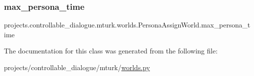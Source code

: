 \subsubsection{\texorpdfstring{max\+\_\+persona\+\_\+time}{max\_persona\_time}}
{\footnotesize\ttfamily projects.\+controllable\+\_\+dialogue.\+mturk.\+worlds.\+Persona\+Assign\+World.\+max\+\_\+persona\+\_\+time}



The documentation for this class was generated from the following file\+:\begin{DoxyCompactItemize}
\item 
projects/controllable\+\_\+dialogue/mturk/\hyperlink{projects_2controllable__dialogue_2mturk_2worlds_8py}{worlds.\+py}\end{DoxyCompactItemize}
